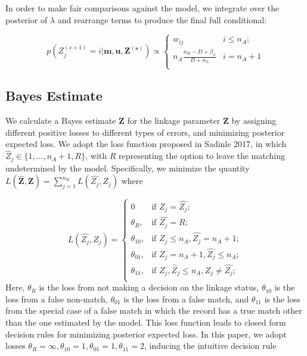 \documentclass[12pt,letterpaper]{article}
\newcommand{\1}[1]{\mathbb{I}\!\left[#1\right]} %
\begin{document}
In order to make fair comparisons against the \citep{sadinle2017} model, we
integrate over the posterior of \(\lambda\) and rearrange terms to
produce the final full conditional:

\[p\left(Z_j^{(s+1)}  = i| \mathbf{m}, \mathbf{u}, \mathbf{Z^{(s)}}\right) \propto
\begin{cases} 
	w_{ij}  & i \leq n_A; \\
	n_A \frac{n_B - D + \beta_{\lambda}}{D + \alpha_{\lambda}} & i  = n_A + 1 \\
\end{cases}\]

\hypertarget{bayes-estimate}{%
	\subsection{Bayes Estimate}
	\label{bayes-estimate}}

We calculate a Bayes estimate \(\hat{\mathbf{Z}}\) for the linkage
parameter \(\mathbf{Z}\) by assigning different positive losses to
different types of errors, and minimizing posterior expected loss. We
adopt the loss function proposed in Sadinle 2017, in which
\(\hat{Z}_j \in \{1, \ldots, n_A + 1, R\}\), with \(R\) representing the
option to leave the matching undetermined by the model. Specifically, we
minimize the quantity
\(L(\hat{\mathbf{Z}}, \mathbf{Z}) = \sum_{j=1}^{n_B} L(\hat{Z_j}, Z_j)\)
where

\[L(\hat{Z_j}, Z_j)=\begin{cases} 
	0  & \text{if } Z_j = \hat{Z_j}; \\
	\theta_R,  & \text{if } \hat{Z_j} = R; \\
	\theta_{10},  & \text{if } Z_j \leq n_A,\hat{Z_j} = n_A + 1 ; \\
	\theta_{01},  & \text{if } Z_j = n_A + 1,\hat{Z_j} \leq n_A ; \\
	\theta_{11},  & \text{if } Z_j, \hat{Z}_j \leq n_A, Z_j \neq \hat{Z_j} ; \\
\end{cases}\] Here, \(\theta_R\) is the loss from not making a decision
on the linkage status, \(\theta_{10}\) is the loss from a false
non-match, \(\theta_{01}\) is the loss from a false match, and
\(\theta_{11}\) is the loss from the special case of a false match in
which the record has a true match other than the one estimated by the
model. This loss function leads to closed form decision rules for
minimizing posterior expected loss. In this paper, we adopt losses
\(\theta_R = \infty, \theta_{10} = 1, \theta_{01} = 1, \theta_{11} = 2\),
inducing the intuitive decision rule
\end{document}
